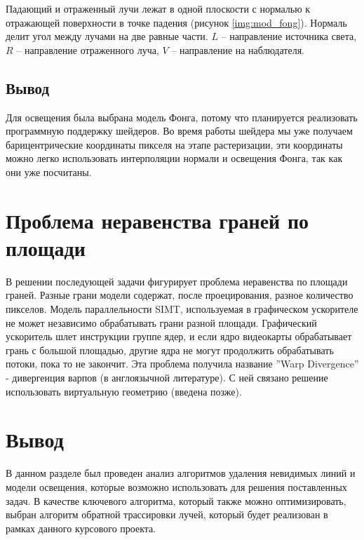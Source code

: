 Падающий и отраженный лучи лежат в одной плоскости с нормалью к отражающей поверхности в точке падения (рисунок \ref{img:mod_fong}). Нормаль делит угол между лучами на две равные части. $L$ – направление источника света, $R$ – направление отраженного луча, $V$ – направление на наблюдателя.

\subsection{Вывод}
Для освещения была выбрана модель Фонга, потому что планируется реализовать программную поддержку шейдеров. Во время работы шейдера мы уже получаем барицентрические координаты пикселя на этапе растеризации, эти координаты можно легко использовать интерполяции нормали и освещения Фонга, так как они уже посчитаны.

\section{Проблема неравенства граней по площади}

В решении последующей задачи фигурирует проблема неравенства по площади граней. Разные грани модели содержат, после проецирования, разное количество 
пикселов. Модель параллельности SIMT, используемая в графическом ускорителе не может независимо обрабатывать грани разной площади. Графический 
ускоритель шлет инструкции группе ядер, и если ядро видеокарты обрабатывает грань с большой площадью, другие ядра не могут продолжить обрабатывать потоки, пока то не закончит.
Эта проблема получила название ''Warp Divergence'' - дивергенция варпов (в англоязычной литературе). С ней связано решение использовать виртуальную геометрию (введена позже).



\section*{Вывод}
В данном разделе был проведен анализ алгоритмов удаления невидимых линий и модели освещения, которые возможно использовать для решения поставленных задач. В качестве ключевого алгоритма, который также можно оптимизировать, выбран алгоритм обратной трассировки лучей, который будет реализован в рамках данного курсового проекта.

